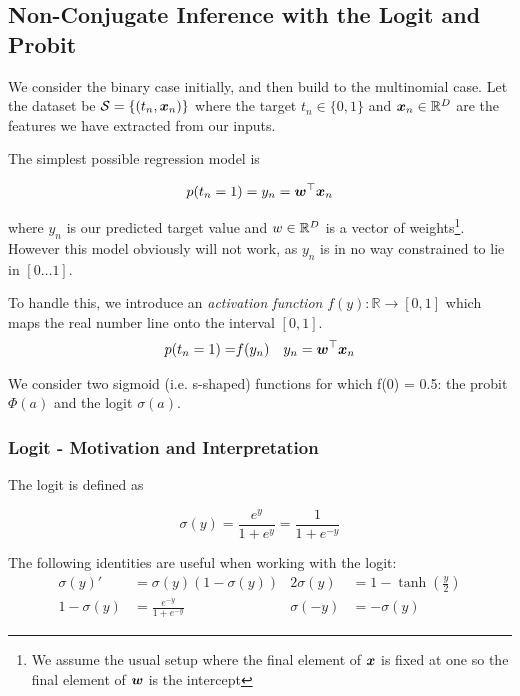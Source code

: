 


\subsection{Non-Conjugate Inference with the Logit and Probit}

We consider the binary case initially, and then build to the multinomial case. Let the dataset be $\mathcal{S} = \{(t_n, \bm x_n)\}$ where the target $t_n \in \{0,1\}$ and $\bm x_n \in { \mathbb{R}^{D} }$ are the features we have extracted from our inputs.

The simplest possible regression model is 

\begin{equation*}
p(t_n = 1) = y_n = \bm w^\top\bm x_n
\end{equation*}

where $y_n$ is our predicted target value and $w \in { \mathbb{R}^{D} }$ is a vector of weights\footnote{We assume the usual setup where the final element of $\bm x$ is fixed at one so the final element of $\bm w$ is the intercept}. However this model obviously will not work, as $y_n$ is in no way constrained to lie in $[0 \ldots 1]$.

To handle this, we introduce an \emph{activation function} $f(y) : \mathbb{R} \rightarrow [0, 1]$ which maps the real number line onto the interval $[0,1]$.
\begin{align*}
p(t_n = 1) = & f(y_n) & y_n  & = \bm w^\top\bm x_n \\
\end{align*}

We consider two sigmoid (i.e. s-shaped) functions for which f(0) = 0.5: the probit $\Phi(a)$ and the logit $\sigma(a)$.

\subsubsection{Logit - Motivation and Interpretation}
The logit is defined as

\begin{equation}
\sigma(y) = \frac{e^y}{1 + e^{y}} = \frac{1}{1+e^{-y}}
\end{equation}

The following identities are useful when working with the logit:
\begin{align}
\sigma(y)' & = \sigma(y)(1 - \sigma(y)) \label{eqn:sigma-identity} &
2 \sigma(y) & = 1 - \tanh (\frac{y}{2}) \\
1 - \sigma(y) & = \frac{e^{-y}}{1 + e^{-y}} &
\sigma(-y) & = -\sigma(y)
\end{align}

